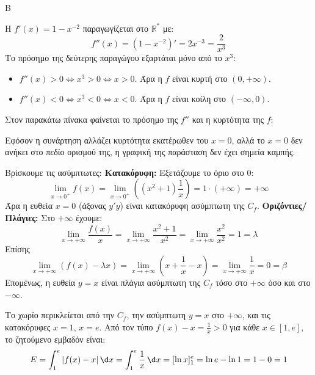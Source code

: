 \begin{thema}{Β}
\begin{erwthma}
\item Η $f'(x) = 1 - x^{-2}$ παραγωγίζεται στο $\mathbb{R}^*$ με:
\[ f''(x) = (1 - x^{-2})' = 2x^{-3} = \frac{2}{x^3} \]
Το πρόσημο της δεύτερης παραγώγου εξαρτάται μόνο από το $x^3$:
\begin{itemize}
    \item $f''(x) > 0 \Leftrightarrow x^3 > 0 \Leftrightarrow x > 0$. Άρα η $f$ είναι κυρτή στο $(0, +\infty)$.
    \item $f''(x) < 0 \Leftrightarrow x^3 < 0 \Leftrightarrow x < 0$. Άρα η $f$ είναι κοίλη στο $(-\infty, 0)$.
\end{itemize}
Στον παρακάτω πίνακα φαίνεται το πρόσημο της $f''$ και η κυρτότητα της $f$:
\begin{center}
\end{center}
Εφόσον η συνάρτηση αλλάζει κυρτότητα εκατέρωθεν του $x=0$, αλλά το $x=0$ δεν ανήκει στο πεδίο ορισμού της, η γραφική της παράσταση δεν έχει σημεία καμπής.

\item Βρίσκουμε τις ασύμπτωτες:
\textbf{Κατακόρυφη:} Εξετάζουμε το όριο στο $0$:
\[ \lim_{x\to0^+} f(x) = \lim_{x\to0^+} \left( (x^2+1)\frac{1}{x} \right) = 1 \cdot (+\infty) = +\infty \]
Άρα η ευθεία $x=0$ (άξονας $y'y$) είναι κατακόρυφη ασύμπτωτη της $C_f$.
\textbf{Οριζόντιες/Πλάγιες:} Στο $+\infty$ έχουμε:
\[\lim\limits_{x\to +\infty}{\frac{f(x)}{x}}=\lim\limits_{x\to +\infty}{\frac{x^2+1}{x^2}}=\lim\limits_{x\to+\infty}{\frac{x^2}{x^2}}=1=\lambda\]
Επίσης
\[\lim\limits_{x\to +\infty}{(f(x)-\lambda x)}=\lim\limits_{x\to +\infty}{\left(x+\frac{1}{x}-x\right)}=\lim\limits_{x\to +\infty}{\frac{1}{x}}=0=\beta\]
Επομένως, η ευθεία $y = x$ είναι πλάγια ασύμπτωτη της $C_f$ τόσο στο $+\infty$ όσο και στο $-\infty$.

\item Το χωρίο περικλείεται από την $C_f$, την ασύμπτωτη $y=x$ στο $+\infty$, και τις κατακόρυφες $x=1$, $x=e$. 
Από τον τύπο $f(x) - x = \frac{1}{x} > 0$ για κάθε $x \in [1, e]$, το ζητούμενο εμβαδόν είναι:
\[ E = \int_1^e |f(x) - x|\,\d x = \int_1^e \frac{1}{x}\,\d x = [\ln x]_1^e = \ln e - \ln 1 = 1 - 0 = 1 \]
\end{erwthma}
\end{thema}

